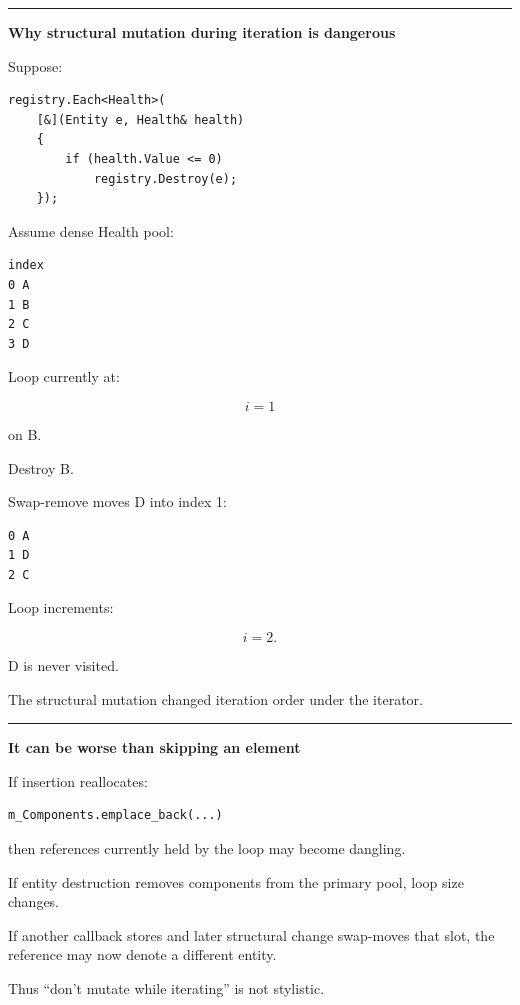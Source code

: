 \begin{center}\rule{0.5\linewidth}{0.5pt}\end{center}

\textbf{Why structural mutation during iteration is dangerous}

Suppose:

\begin{verbatim}
registry.Each<Health>(
    [&](Entity e, Health& health)
    {
        if (health.Value <= 0)
            registry.Destroy(e);
    });
\end{verbatim}

Assume dense Health pool:

\begin{verbatim}
index
0 A
1 B
2 C
3 D
\end{verbatim}

Loop currently at:

\[
i=1
\]

on B.

Destroy B.

Swap-remove moves D into index 1:

\begin{verbatim}
0 A
1 D
2 C
\end{verbatim}

Loop increments:

\[
i=2.
\]

D is never visited.

The structural mutation changed iteration order under the iterator.

\begin{center}\rule{0.5\linewidth}{0.5pt}\end{center}

\textbf{It can be worse than skipping an element}

If insertion reallocates:

\begin{verbatim}
m_Components.emplace_back(...)
\end{verbatim}

then references currently held by the loop may become dangling.

If entity destruction removes components from the primary pool, loop size changes.

If another callback stores  and later structural change swap-moves that slot, the reference may now denote a different entity.

Thus ``don't mutate while iterating'' is not stylistic.

